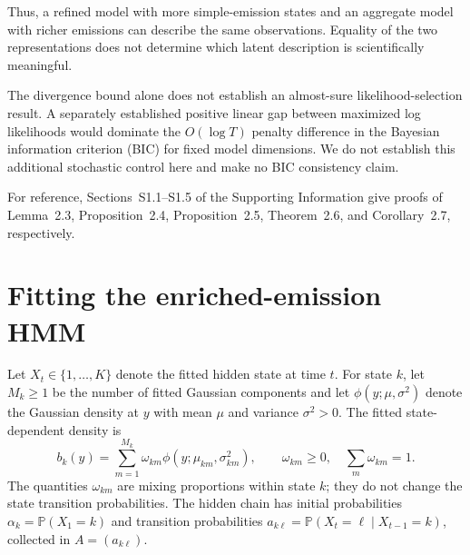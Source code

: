 \documentclass[11pt]{article}
\theoremstyle{definition}
\newcommand{\Pbb}{\mathbb{P}}
\begin{document}
Thus, a refined model with more simple-emission states and an aggregate model
with richer emissions can describe the same observations. Equality of the two
representations does not determine which latent description is scientifically
meaningful.

The divergence bound alone does not establish an almost-sure
likelihood-selection result. A separately established positive linear gap
between maximized log likelihoods would dominate the $O(\log T)$ penalty
difference in the Bayesian information criterion (BIC) for fixed model
dimensions. We do not establish this additional stochastic control here
and make no BIC consistency claim.

For reference, Sections~S1.1--S1.5 of the Supporting Information give proofs
of Lemma~2.3, Proposition~2.4, Proposition~2.5, Theorem~2.6, and
Corollary~2.7, respectively.

\section{Fitting the enriched-emission HMM}\label{sec:em}

Let $X_t\in\{1,\ldots,K\}$ denote the fitted hidden state at time $t$. For
state $k$, let $M_k\geq1$ be the number of fitted Gaussian components and let
$\phi(y;\mu,\sigma^2)$ denote the Gaussian density at $y$ with mean $\mu$ and
variance $\sigma^2>0$. The fitted state-dependent density is
\begin{equation*}
 b_k(y)=\sum_{m=1}^{M_k}\omega_{km}
 \phi(y;\mu_{km},\sigma_{km}^2),
 \qquad \omega_{km}\geq0,\quad \sum_m\omega_{km}=1.
\end{equation*}
The quantities $\omega_{km}$ are mixing proportions within state $k$; they do
not change the state transition probabilities. The hidden chain has initial
probabilities $\alpha_k=\Pbb(X_1=k)$ and transition probabilities
$a_{k\ell}=\Pbb(X_t=\ell\mid X_{t-1}=k)$, collected in
$A=(a_{k\ell})$.
\end{document}
